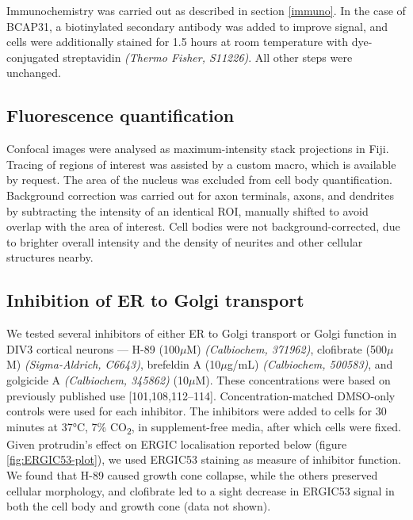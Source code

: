 \documentclass[
  12pt,
  a4paper,
]{book}
\begin{document}
Immunochemistry was carried out as described in section \ref{immuno}. In the case of BCAP31, a biotinylated secondary antibody was added to improve signal, and cells were additionally stained for 1.5 hours at room temperature with dye-conjugated streptavidin \emph{(Thermo Fisher, S11226)}. All other steps were unchanged.

\hypertarget{fluorescence-quantification}{%
\subsection{Fluorescence quantification}\label{fluorescence-quantification}}

Confocal images were analysed as maximum-intensity stack projections in Fiji. Tracing of regions of interest was assisted by a custom macro, which is available by request. The area of the nucleus was excluded from cell body quantification. Background correction was carried out for axon terminals, axons, and dendrites by subtracting the intensity of an identical ROI, manually shifted to avoid overlap with the area of interest. Cell bodies were not background-corrected, due to brighter overall intensity and the density of neurites and other cellular structures nearby.

\hypertarget{inhibition-of-er-to-golgi-transport}{%
\subsection{Inhibition of ER to Golgi transport}\label{inhibition-of-er-to-golgi-transport}}

We tested several inhibitors of either ER to Golgi transport or Golgi function in DIV3 cortical neurons --- H-89 (100\(\mu\)M) \emph{(Calbiochem, 371962)}, clofibrate (500\(\mu\)M) \emph{(Sigma-Aldrich, C6643)}, brefeldin A (10\(\mu\)g/mL) \emph{(Calbiochem, 500583)}, and golgicide A \emph{(Calbiochem, 345862)} (10\(\mu\)M). These concentrations were based on previously published use {[}101,108,112--114{]}. Concentration-matched DMSO-only controls were used for each inhibitor. The inhibitors were added to cells for 30 minutes at 37°C, 7\% CO\textsubscript{2}, in supplement-free media, after which cells were fixed. Given protrudin's effect on ERGIC localisation reported below (figure \ref{fig:ERGIC53-plot}), we used ERGIC53 staining as measure of inhibitor function. We found that H-89 caused growth cone collapse, while the others preserved cellular morphology, and clofibrate led to a sight decrease in ERGIC53 signal in both the cell body and growth cone (data not shown).
\end{document}
